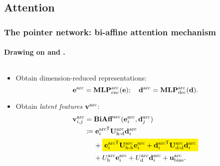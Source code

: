 \documentclass[8pt]{beamer}
\theoremstyle{definition}
\theoremstyle{plain}
\theoremstyle{definition}
\theoremstyle{remark}
\numberwithin{equation}{section}
\numberwithin{figure}{section}
\numberwithin{table}{section}
\newcommand{\mathcolorbox}[2]{\colorbox{#1}{$\displaystyle #2$}}
\newcommand*{\tran}{^{\mkern-1.5mu\mathsf{T}}}
\begin{document}
\subsection{Attention}
\begin{frame}
    \frametitle{The pointer network: bi-affine attention mechanism}
    \framesubtitle{Drawing on \textcite{dozat2016deep} and \textcite{vinyals2015pointer}.}
    \begin{columns}[t,onlytextwidth]
        \begin{column}[t]{0.52\textwidth}
            \begin{itemize}
            \item Obtain dimension-reduced representations:
            \[
                \vb{e}^{\text{arc}} = \mathbf{MLP}_{\text{enc}}^{\text{arc}}(\vb{e}); \quad \vb{d}^{\text{arc}} = \mathbf{MLP}_{\text{dec}}^{\text{arc}}(\vb{d}).
            \]

            \item Obtain \textit{latent features} \(\vb{v}^{\text{arc}}\):
            \begin{align*}
                \vb{v}^{\text{arc}}_{i,j} &= \mathbf{BiAff}^{\text{arc}}(\vb{e}^{\text{arc}}_{i}, \vb{d}^{\text{arc}}_{j}) \\
                &\coloneqq {\vb{e}^{\text{arc}}_{i}}\tran \mathbf{U}_{\text{h-d}}^{\text{arc}} \vb{d}_{i}^{\text{arc}} \\
                    &\phantom{\coloneqq}\   + \mathcolorbox{yellow}{
                        {\vb{e}_{i}^{\text{arc}}}\tran \mathbf{U}_{\text{h-h}}^{\text{arc}} \vb{e}_{i}^{\text{arc}}
                        + {\vb{d}_{i}^{\text{arc}}}\tran \mathbf{U}_{\text{d-d}}^{\text{arc}} \vb{d}_{i}^{\text{arc}}
                    } \\
                    &\phantom{\coloneqq}\  + U_{\text{h}}^{\text{arc}} \vb{e}_{i}^{\text{arc}}
                    + U_{\text{d}}^{\text{arc}} \vb{d}_{i}^{\text{arc}}
                    + \vb{u}_{\text{bias}}^{\text{arc}}.
            \end{align*}


\end{itemize}
\end{column}
\end{columns}
\end{frame}
\end{document}
